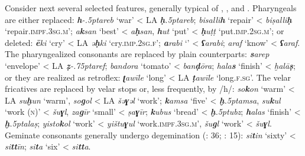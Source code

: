 \documentclass[output=paper]{langsci/langscibook}
\begin{document}
Consider next several selected features, generally typical of ,  , and .  Pharyngeals are either replaced:  \textit{\textbf{h}\kern -.5ptareb} ‘war’ < LA \textit{\textbf{ḥ}\kern .5ptareb};   \textit{bisalli\textbf{h}} ‘repair’ <  \textit{biṣalli\textbf{ḥ}} ‘repair.\textsc{impf}.\textsc{3sg.m}’;  \textit{a\textbf{k}san} ‘best’ <  \textit{a\textbf{ḥ}san}, \textit{\textbf{h}ut} ‘put’ <  \textit{\textbf{ḥ}uṭṭ} ‘put.\textsc{imp.2sg.m}’; or deleted:  \textit{\textbf{ē}ki} ‘cry’ < LA \textit{ə\textbf{ḥ}ki} ‘cry.\textsc{imp}.2\textsc{sg}.\textsc{f}’;   \textit{\textbf{a}rabi} ‘’ <  \textit{\textbf{ʕ}arabi};  \textit{araf} ‘know’ <  \textit{\textbf{ʕ}araf}. The {pharyngealized} consonants are replaced by plain counterparts:   \textit{\textbf{s}arep} ‘envelope’ < LA \textit{\textbf{ẓ}\kern -.75ptaref};   \textit{bandora} ‘tomato’ <  \textit{ban\textbf{ḍ}ōra};  \textit{hala\textbf{s}} `finish' <  \textit{ḫalā\textbf{ṣ}}; or they are realized as retroflex:  \textit{\textbf{ʈ}awīle} ‘long’ < LA \textit{\textbf{ṭ}awīle} ‘long.\textsc{f}.\textsc{sg}’. The velar fricatives are replaced by velar stops or, less frequently, by /h/:  \textit{so\textbf{k}on} ‘warm’ < LA \textit{su\textbf{ḫ}un} ‘warm’, \textit{so\textbf{g}ol} < LA \textit{šə\textbf{ɣ}əl} ‘work’;   \textit{\textbf{k}amsa} ‘five’ <  \textit{\textbf{ḫ}\kern .5ptamsa}, \textit{su\textbf{k}ul} ‘work (\textsc{n})’ <  \textit{šu\textbf{ɣ}l}, \textit{za\textbf{g}īr} ‘small’ <  \textit{ṣa\textbf{ɣ}īr};  \textit{\textbf{k}ubus} ‘bread’ <  \textit{\textbf{ḫ}\kern .5ptubz}; \textit{\textbf{h}alas} ‘finish’ <  \textit{\textbf{ḫ}\kern .5ptalaṣ}; \textit{yisto\textbf{k}ol} ‘work’ <  \textit{yištu\textbf{ɣ}ul} ‘work.\textsc{impf.3sg.m}’, \textit{šu\textbf{g}l} ‘work’ <  \textit{šu\textbf{ɣ}l}. Geminate consonants generally undergo {degemination} (\citealt{Næss2008}: 36; \citealt{Avram2014Pidgin}: 15):   \textit{si\textbf{t}in} ‘sixty’ <  \textit{si\textbf{tt}īn};  \textit{si\textbf{t}a} ‘six’ <  \textit{si\textbf{tt}a}.
\end{document}
